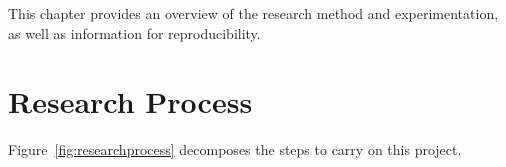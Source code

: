 \documentclass[nomenclature, english, bibtex]{kththesis}
\begin{document}
This chapter provides an overview of the research method and experimentation, as well as information for reproducibility. 



\section{Research Process}
\label{sec:researchProcess}

Figure~\ref{fig:researchprocess} decomposes the steps to carry on this project. 

\end{document}
